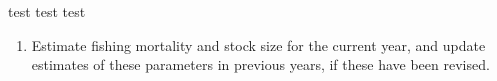 

test test test



\begin{enumerate}
\item Estimate fishing mortality and stock size for the current year, and update estimates of these parameters in previous years, if these have been revised.
\end{enumerate}
 
